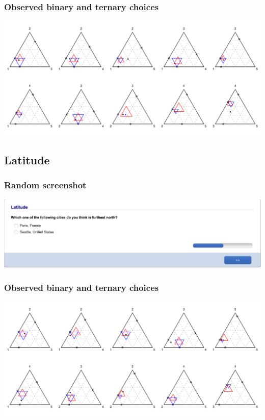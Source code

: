 \documentclass[11pt,letter]{article}
\begin{document}
\subsubsection*{Observed binary and ternary choices}

\includegraphics[width=15cm]{./Population_study_data/Simplexes/Marijuana.pdf}

\pagebreak

\subsection*{Latitude}



\subsubsection*{Random screenshot}

\includegraphics[width=15cm]{Population_study_design/screenshot_Latitude.png}

\subsubsection*{Observed binary and ternary choices}

\includegraphics[width=15cm]{./Population_study_data/Simplexes/Latitude.pdf}
\end{document}
